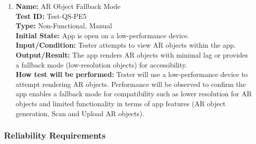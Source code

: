\documentclass[12pt, titlepage]{article}
\begin{document}
\begin{enumerate}
  \item \textbf{Name:} AR Object Fallback Mode \label{itm:Test-QS-PE5} \\
    \textbf{Test ID:} Test-QS-PE5 \\
    \textbf{Type:} Non-Functional, Manual \\
    \textbf{Initial State:} App is open on a low-performance device. \\
    \textbf{Input/Condition:} Tester attempts to view AR objects within the app. \\
    \textbf{Output/Result:} The app renders AR objects with minimal lag or provides a fallback mode (low-resolution objects) for accessibility. \\
    \textbf{How test will be performed:} Tester will use a low-performance device to attempt rendering AR objects. Performance will be observed to confirm the app enables a fallback mode for compatibility such as lower resolution for AR objects and limited functionality in terms of app features (AR object generation, Scan and Upload AR objects). \\

\end{enumerate}

\subsubsection{Reliability Requirements}
\end{document}
